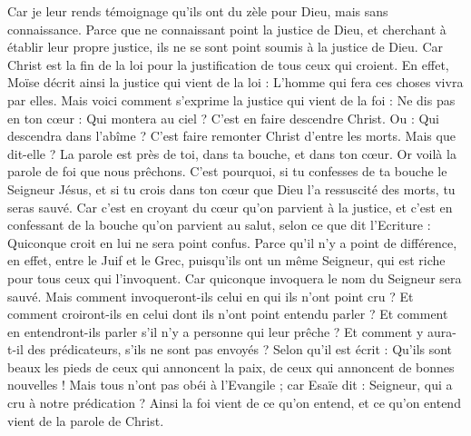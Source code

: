 \begin{multicols}{2}
Car je leur rends témoignage qu'ils ont du zèle pour Dieu, mais sans connaissance.
Parce que ne connaissant point la justice de Dieu, et cherchant à établir leur propre justice, ils ne se sont point soumis à la justice de Dieu.
Car Christ est la fin de la loi pour la justification de tous ceux qui croient.
En effet, Moïse décrit ainsi la justice qui vient de la loi : L'homme qui fera ces choses vivra par elles.
Mais voici comment s'exprime la justice qui vient de la foi : Ne dis pas en ton cœur : Qui montera au ciel ? C’est en faire descendre Christ.
Ou : Qui descendra dans l'abîme ? C’est faire remonter Christ d’entre les morts.
Mais que dit-elle ? La parole est près de toi, dans ta bouche, et dans ton cœur. Or voilà la parole de foi que nous prêchons.
C'est pourquoi, si tu confesses de ta bouche le Seigneur Jésus, et si tu crois dans ton cœur que Dieu l'a ressuscité des morts, tu seras sauvé.
Car c’est en croyant du cœur qu’on parvient à la justice, et c’est en confessant de la bouche qu’on parvient au salut, selon ce que dit l’Ecriture :
Quiconque croit en lui ne sera point confus.
Parce qu'il n'y a point de différence, en effet, entre le Juif et le Grec, puisqu’ils ont un même Seigneur, qui est riche pour tous ceux qui l'invoquent.
Car quiconque invoquera le nom du Seigneur sera sauvé.
Mais comment invoqueront-ils celui en qui ils n'ont point cru ? Et comment croiront-ils en celui dont ils n'ont point entendu parler ? Et comment en entendront-ils parler s'il n'y a personne qui leur prêche ?
Et comment y aura-t-il des prédicateurs, s’ils ne sont pas envoyés ? Selon qu'il est écrit : Qu’ils sont beaux les pieds de ceux qui annoncent la paix, de ceux qui annoncent de bonnes nouvelles !
Mais tous n'ont pas obéi à l'Evangile ; car Esaïe dit : Seigneur, qui a cru à notre prédication ?
Ainsi la foi vient de ce qu’on entend, et ce qu’on entend vient de la parole de Christ.

\end{multicols}
